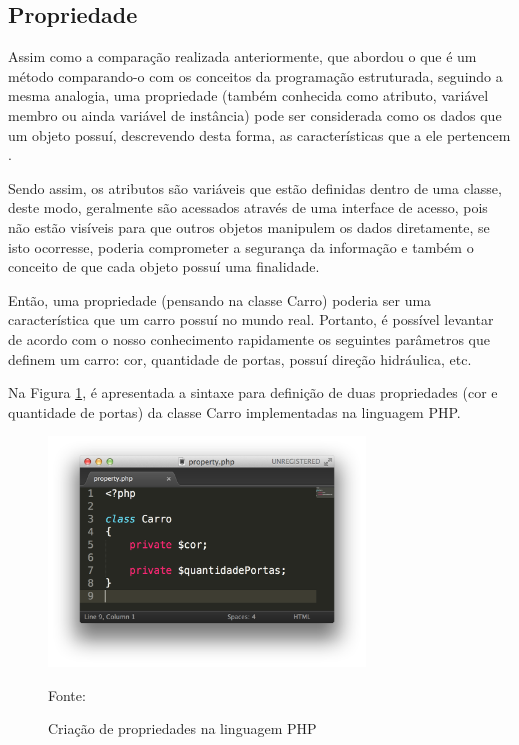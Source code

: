 \subsection{Propriedade}

Assim como a comparação realizada anteriormente, que abordou o que é um método
comparando-o com os conceitos da programação estruturada, seguindo a mesma
analogia, uma propriedade (também conhecida como atributo, variável membro ou ainda variável
de instância) pode ser considerada como os dados que um objeto possuí,
descrevendo desta forma, as características que a ele pertencem
\cite{programmingPhp}.

Sendo assim, os atributos são variáveis que estão definidas dentro de uma
classe, deste modo, geralmente são acessados através de uma interface de acesso,
pois não estão visíveis para que outros objetos manipulem os dados diretamente,
se isto ocorresse, poderia comprometer a segurança da informação e também o
conceito de que cada objeto possuí uma finalidade.

Então, uma propriedade (pensando na classe Carro) poderia ser uma característica
que um carro possuí no mundo real. Portanto, é possível levantar de acordo com
o nosso conhecimento rapidamente os seguintes parâmetros que definem um carro:
cor, quantidade de portas, possuí direção hidráulica, etc.

Na Figura \ref{fig:propriedade}, é apresentada a sintaxe para definição de duas
propriedades (cor e quantidade de portas) da classe Carro implementadas na
linguagem \acs{PHP}.

\begin{figure}[h!tb]
	\caption{Criação de propriedades na linguagem PHP}
	\label{fig:propriedade}

	\centering
	\includegraphics[width=0.75\textwidth]{images/property.png}

	\centering
	\footnotesize Fonte: \fonteOAutor
\end{figure}

